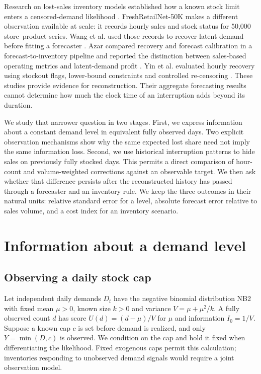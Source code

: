 \documentclass[11pt,a4paper]{article}
\begin{document}
Research on lost-sales inventory models established how a known stock limit enters a censored-demand likelihood \cite{ref1}. FreshRetailNet-50K makes a different observation available at scale: it records hourly sales and stock status for 50,000 store--product series. Wang et al. used those records to recover latent demand before fitting a forecaster \cite{ref2}. Azar compared recovery and forecast calibration in a forecast-to-inventory pipeline and reported the distinction between sales-based operating metrics and latent-demand profit \cite{ref3}. Yin et al. evaluated hourly recovery using stockout flags, lower-bound constraints and controlled re-censoring \cite{ref4}. These studies provide evidence for reconstruction. Their aggregate forecasting results cannot determine how much the clock time of an interruption adds beyond its duration.

We study that narrower question in two stages. First, we express information about a constant demand level in equivalent fully observed days. Two explicit observation mechanisms show why the same expected lost share need not imply the same information loss. Second, we use historical interruption patterns to hide sales on previously fully stocked days. This permits a direct comparison of hour-count and volume-weighted corrections against an observable target. We then ask whether that difference persists after the reconstructed history has passed through a forecaster and an inventory rule. We keep the three outcomes in their natural units: relative standard error for a level, absolute forecast error relative to sales volume, and a cost index for an inventory scenario.

\section{Information about a demand level}

\subsection{Observing a daily stock cap}

Let independent daily demands \(D_t\) have the negative binomial distribution NB2 with fixed mean \(\mu>0\), known size \(k>0\) and variance \(V=\mu+\mu^2/k\). A fully observed count \(d\) has score \(U(d)=(d-\mu)/V\) for \(\mu\) and information \(I_0=1/V\). Suppose a known cap \(c\) is set before demand is realized, and only \(Y=\min(D,c)\) is observed. We condition on the cap and hold it fixed when differentiating the likelihood. Fixed exogenous caps permit this calculation; inventories responding to unobserved demand signals would require a joint observation model.
\end{document}
